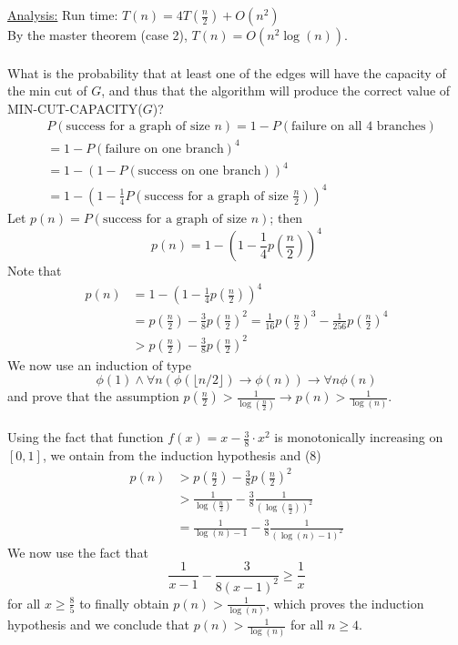 \documentclass[12pt, letterpaper]{article}
\begin{document}
\underline{Analysis:}
Run time: $T(n) = 4T(\frac{n}{2}) + O(n^2)$\\
By the master theorem (case 2), $T(n) = O(n^2\log(n))$.\\\\
What is the probability that at least one of the edges will have the capacity of the min cut of $G$, and thus that the algorithm will produce the correct value of MIN-CUT-CAPACITY($G$)?\begin{align*}
    &P(\text{success for a graph of size $n$}) = 1 - P(\text{failure on all 4 branches})\\
    &=1 - P(\text{failure on one branch})^4\\
    &= 1 - (1-P(\text{success on one branch}))^4\\
    &= 1 - (1 - \frac{1}{4}P(\text{success for a graph of size $\frac{n}{2}$}))^4
\end{align*}
Let $p(n) = P(\text{success for a graph of size $n$})$; then \begin{equation*}
    p(n) = 1 - (1 - \frac{1}{4}p(\frac{n}{2}))^4
\end{equation*}
Note that \begin{align}
    p(n) &= 1 - (1 - \frac{1}{4}p(\frac{n}{2}))^4\\
    &= p(\frac{n}{2}) - \frac{3}{8}p(\frac{n}{2})^2 = \frac{1}{16}p(\frac{n}{2})^3 - \frac{1}{256}p(\frac{n}{2})^4\\
    &> p (\frac{n}{2}) - \frac{3}{8}p(\frac{n}{2})^2
\end{align}
We now use an induction of type \[\phi(1) \land \forall n (\phi(\lfloor n/2 \rfloor) \to \phi(n)) \to \forall n \phi(n)\] and prove that the assumption $p(\frac{n}{2}) > \frac{1}{\log(\frac{n}{2})} \to p(n) > \frac{1}{\log(n)}$.\\\\
Using the fact that function $f(x) = x - \frac{3}{8}\cdot x^2$ is monotonically increasing on $[0, 1]$, we ontain from the induction hypothesis and (8) \begin{align*}
    p(n) &> p(\frac{n}{2}) - \frac{3}{8}p(\frac{n}{2})^2\\
    &>\frac{1}{\log(\frac{n}{2})} - \frac{3}{8}\frac{1}{(\log(\frac{n}{2}))^2}\\
    &= \frac{1}{\log(n) - 1} - \frac{3}{8}\frac{1}{(\log(n) - 1)^2}
\end{align*}
We now use the fact that \[\frac{1}{x - 1} - \frac{3}{8(x - 1)^2}\geq\frac{1}{x}\]
for all $x\geq \frac{8}{5}$ to finally obtain $p(n) > \frac{1}{\log(n)}$, which proves the induction hypothesis and we conclude that $p(n) > \frac{1}{\log(n)}$ for all $n \geq 4$.\\\\
\end{document}
